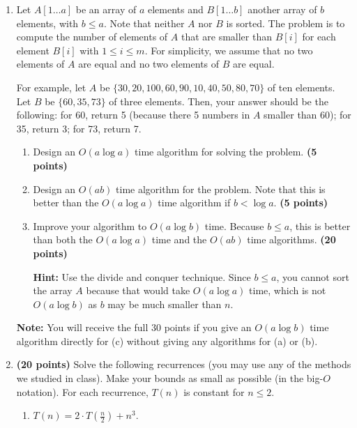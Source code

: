 \documentclass[11pt]{article}
\begin{document}
\begin{enumerate}
\begin{enumerate}
\begin{description}
\end{description}

\end{enumerate}

\item %

Let $A[1\ldots a]$ be an array of $a$ elements and $B[1\ldots b]$ another array of $b$ elements, with $b\leq a$. Note that neither $A$ nor $B$ is sorted. The problem is to compute the number of elements of $A$ that are smaller than $B[i]$ for each element $B[i]$ with $1\leq i\leq m$.
For simplicity, we assume that no two elements of $A$ are equal and no two elements of $B$ are equal.

For example, let $A$ be $\{30, 20, 100, 60, 90, 10, 40, 50, 80, 70\}$ of ten elements. Let $B$ be $\{60, 35, 73\}$ of three elements. Then, your answer should be the following: for 60, return 5 (because there 5 numbers in $A$ smaller than 60); for 35, return 3; for 73, return 7.

\begin{enumerate}
\item
Design an $O(a\log a)$ time algorithm for solving the problem. {\hfill \bf (5 points)}

\item
Design an $O(ab)$ time algorithm for the problem. Note that this is better than the $O(a\log a)$ time algorithm if $b<\log a$. {\hfill \bf (5 points)}

\item
Improve your algorithm to $O(a\log b)$ time. Because $b\leq a$, this is better than both the $O(a\log a)$ time and the $O(ab)$ time algorithms. {\hfill \bf (20 points)}


{\bf Hint:} Use the divide and conquer technique. Since $b\leq a$, you cannot sort the array $A$ because that would take $O(a\log a)$ time, which is not $O(a\log b)$ as $b$ may be much smaller than $n$.
\end{enumerate}


{\bf Note:}
You will receive the full 30 points if you give an $O(a\log b)$ time algorithm directly for (c) without giving any algorithms for (a) or (b).


\item %
{\bf (20 points)}
Solve the following recurrences (you may use any of the methods we studied in class). Make your bounds as small as possible (in the big-$O$ notation). For each recurrence, $T(n)$ is constant for $n\leq 2$.

\begin{enumerate}
\item
$T(n)=2\cdot T(\frac{n}{2})+ n^3$.


\end{enumerate}
\end{enumerate}
\end{document}
